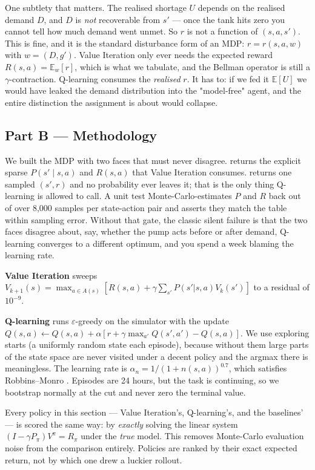 \documentclass{ai-lab-report}
\begin{document}
One subtlety that matters. The realised shortage $U$ depends on the realised demand $D$, and
$D$ is \emph{not} recoverable from $s'$ --- once the tank hits zero you cannot tell how much
demand went unmet. So $r$ is not a function of $(s,a,s')$. This is fine, and it is the standard
disturbance form of an MDP: $r = r(s,a,w)$ with $w = (D, g')$. Value Iteration only ever needs
the expected reward $R(s,a) = \mathbb{E}_w[r]$, which is what we tabulate, and the Bellman
operator is still a $\gamma$-contraction. Q-learning consumes the \emph{realised} $r$. It has to:
if we fed it $\mathbb{E}[U]$ we would have leaked the demand distribution into the "model-free"
agent, and the entire distinction the assignment is about would collapse.

\subsection{Part B --- Methodology}
We built the MDP with two faces that must never disagree.  returns the
explicit sparse $P(s'\mid s,a)$ and $R(s,a)$ that Value Iteration consumes.  returns
one sampled $(s', r)$ and no probability ever leaves it; that is the only thing Q-learning is
allowed to call. A unit test Monte-Carlo-estimates $P$ and $R$ back out of  over
8{,}000 samples per state-action pair and asserts they match the table within sampling error.
Without that gate, the classic silent failure is that the two faces disagree about, say, whether
the pump acts before or after demand, Q-learning converges to a different optimum, and you spend
a week blaming the learning rate.

\textbf{Value Iteration} sweeps $V_{k+1}(s) = \max_{a \in A(s)} [R(s,a) + \gamma \sum_{s'}
P(s'|s,a) V_k(s')]$ to a residual of $10^{-9}$.

\textbf{Q-learning} runs $\varepsilon$-greedy on the simulator with the update
$Q(s,a) \leftarrow Q(s,a) + \alpha [r + \gamma \max_{a'} Q(s',a') - Q(s,a)]$. We use exploring
starts (a uniformly random state each episode), because without them large parts of the state
space are never visited under a decent policy and the argmax there is meaningless. The learning
rate is $\alpha_n = 1/(1+n(s,a))^{0.7}$, which satisfies Robbins--Monro
\citep{evendar2003rates}. Episodes are 24 hours, but the task is continuing, so we bootstrap
normally at the cut and never zero the terminal value.

Every policy in this section --- Value Iteration's, Q-learning's, and the baselines' --- is scored
the same way: by \emph{exactly} solving the linear system $(I - \gamma P_\pi)V^\pi = R_\pi$ under
the \emph{true} model. This removes Monte-Carlo evaluation noise from the comparison entirely.
Policies are ranked by their exact expected return, not by which one drew a luckier rollout.
\end{document}
